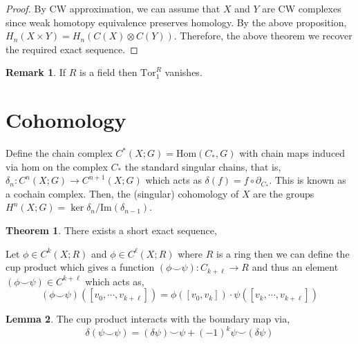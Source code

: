 \documentclass[12pt]{extarticle}
\newcommand{\Hom}[2]{\mathrm{Hom}\left( #1, #2 \right)}
\renewcommand{\Im}[1]{\mathrm{Im}(#1)}
\theoremstyle{definition}
\newtheorem{theorem}{Theorem}[section]
\newtheorem{lemma}[theorem]{Lemma}
\newtheorem{remark}{Remark}
\newenvironment{definition}[1][Definition:]{\begin{trivlist}
\item[\hskip \labelsep {\bfseries #1}]}{\end{trivlist}}
\newcommand{\Ext}[4]{\mathrm{Ext}^{#1}_{#2} \left( #3, #4 \right)}
\begin{document}
\begin{proof}
By CW approximation, we can assume that $X$ and $Y$ are CW complexes since weak homotopy equivalence preserves homology. By the above proposition, $H_n(X \times Y) = H_n(C(X) \otimes C(Y))$. Therefore, the above theorem we recover the required exact sequence. 
\end{proof}

\begin{remark}
If $R$ is a field then $\mathrm{Tor}^R_1$ vanishes.
\end{remark}

\section{Cohomology}

\begin{definition}[Singular Cohomlogy]
Define the chain complex $C^{\ast}(X ; G) = \Hom{C_{\ast}}{G}$ with chain maps induced via hom on the complex $C_{\ast}$ the standard singular chains, that is, $\delta_n : C^{n}(X ; G) \to C^{n+1}(X ; G)$ which acts as $\delta(f) = f \circ \partial_{C_{\ast}}$. This is known as a cochain complex. Then, the (singular) cohomology of $X$ are the groups $H^n(X ; G) = \ker{\delta_{n}} / \Im{\delta_{n-1}}$.  
\end{definition}

\begin{theorem}
There exists a short exact sequence,
\begin{center}
\end{center}
\end{theorem}

\begin{definition}
Let $\phi \in C^k(X ; R)$ and $\phi \in C^{\ell}(X ; R)$ where $R$ is a ring then we can define the cup product which gives a function $(\phi \smile \psi) : C_{k + \ell} \to R$ and thus an element $(\phi \smile \psi) \in C^{k + \ell}$ which acts as,
\[ (\phi \smile \psi)([v_0, \cdots, v_{k + \ell}]) = \phi([v_0, v_{k}]) \cdot \psi([v_k, \cdots, v_{k+\ell}]) \] 
\end{definition}

\begin{lemma}
The cup product interacts with the boundary map via,
\[\delta(\psi \smile \psi) = (\delta \psi) \smile \psi + (-1)^k \psi \smile (\delta \psi) \]
\end{lemma}
\end{document}
